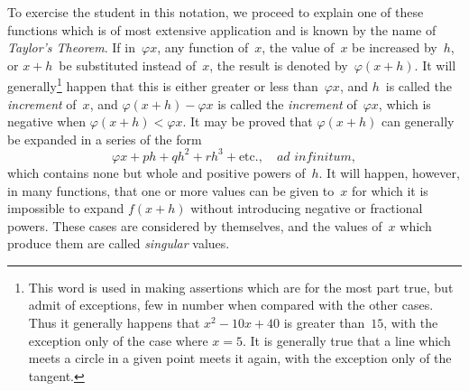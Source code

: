 \documentclass[12pt]{book}[2005/09/16]
\newcommand{\Pagelabel}[1]{\phantomsection\label{page:#1}}
\newcommand{\PageSep}[1]{\Pagelabel{#1}\ignorespaces}
\renewcommand{\etc}{\text{etc}}
\renewcommand{\(}{{\upshape(}}
\renewcommand{\)}{{\upshape)}}
\renewcommand{\phi}{\varphi}
\begin{document}
To exercise the student in this notation, we proceed
%
%
to explain one of these functions which is of
most extensive application and is known by the name
of \emph{Taylor's Theorem}. If in~$\phi x$, any function of~$x$, the
value of~$x$ be increased by~$h$, or $x +  h$~be substituted
instead of~$x$, the result is denoted by~$\phi(x + h)$. It
\PageSep{16}
will generally\footnote
  {This word is used in making assertions which are for the most part
%
  true, but admit of exceptions, few in number when compared with the other
  cases. Thus it generally happens that $x^{2} - 10x + 40$ is greater than~$15$, with
  the exception only of the case where $x = 5$. It is generally true that a line
  which meets a circle in a given point meets it again, with the exception only
  of the tangent.}
happen that this is either greater or
less than~$\phi x$, and $h$~is called the \emph{increment} of~$x$, and
%
$\phi(x +  h) - \phi x$ is called the \emph{increment} of~$\phi x$, which is
negative when $\phi(x + h) < \phi x$. It may be proved
that $\phi(x + h)$ can generally be expanded in a series
of the form
\[
\phi x +  ph + qh^{2} + rh^{3} + \etc.,\quad \textit{ad infinitum},
\]
which contains none but whole and positive powers
of~$h$. It will happen, however, in many functions,
that one or more values can be given to~$x$ for which
it is impossible to expand $f(x + h)$ without introducing
negative or fractional powers. These cases are
considered by themselves, and the values of~$x$ which
produce them are called \emph{singular} values.
%
\end{document}
